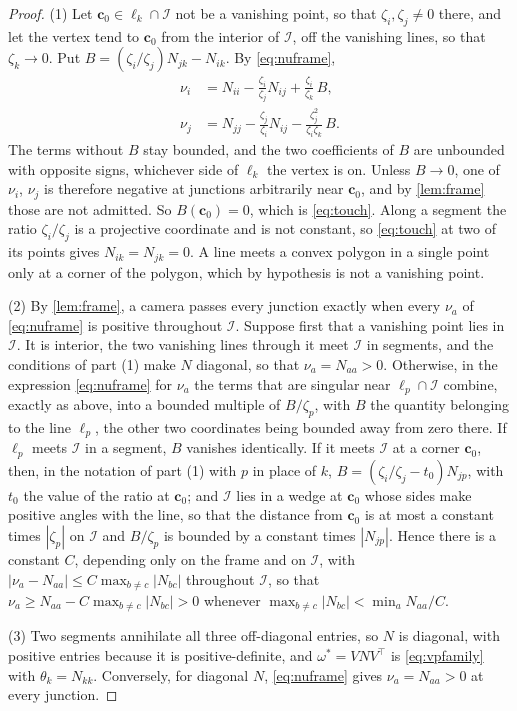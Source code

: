 \documentclass[pdflatex,sn-mathphys-num,iicol]{sn-jnl}
\newcommand{\vc}{\mathbf{c}}
\theoremstyle{thmstyleone}
\theoremstyle{thmstylethree}
\theoremstyle{thmstyletwo}
\begin{document}
\begin{proof}
(1) Let $\vc_0\in\ell_k\cap \mathcal I$ not be a vanishing point, so that $\zeta_i,\zeta_j\neq0$ there, and let the vertex tend to $\vc_0$ from the interior of $\mathcal I$, off the vanishing lines, so that $\zeta_k\to0$. Put $B=(\zeta_i/\zeta_j)N_{jk}-N_{ik}$. By \eqref{eq:nuframe},
\[
\begin{aligned}
\nu_i&=N_{ii}-\frac{\zeta_i}{\zeta_j}N_{ij}+\frac{\zeta_i}{\zeta_k}\,B,\\
\nu_j&=N_{jj}-\frac{\zeta_j}{\zeta_i}N_{ij}-\frac{\zeta_j^2}{\zeta_i\zeta_k}\,B .
\end{aligned}
\]
The terms without $B$ stay bounded, and the two coefficients of $B$ are unbounded with opposite signs, whichever side of $\ell_k$ the vertex is on. Unless $B\to0$, one of $\nu_i$, $\nu_j$ is therefore negative at junctions arbitrarily near $\vc_0$, and by \cref{lem:frame} those are not admitted. So $B(\vc_0)=0$, which is \eqref{eq:touch}. Along a segment the ratio $\zeta_i/\zeta_j$ is a projective coordinate and is not constant, so \eqref{eq:touch} at two of its points gives $N_{ik}=N_{jk}=0$. A line meets a convex polygon in a single point only at a corner of the polygon, which by hypothesis is not a vanishing point.

(2) By \cref{lem:frame}, a camera passes every junction exactly when every $\nu_a$ of \eqref{eq:nuframe} is positive throughout $\mathcal I$. Suppose first that a vanishing point lies in $\mathcal I$. It is interior, the two vanishing lines through it meet $\mathcal I$ in segments, and the conditions of part (1) make $N$ diagonal, so that $\nu_a=N_{aa}>0$. Otherwise, in the expression \eqref{eq:nuframe} for $\nu_a$ the terms that are singular near $\ell_p\cap \mathcal I$ combine, exactly as above, into a bounded multiple of $B/\zeta_p$, with $B$ the quantity belonging to the line $\ell_p$, the other two coordinates being bounded away from zero there. If $\ell_p$ meets $\mathcal I$ in a segment, $B$ vanishes identically. If it meets $\mathcal I$ at a corner $\vc_0$, then, in the notation of part (1) with $p$ in place of $k$, $B=(\zeta_i/\zeta_j-t_0)N_{jp}$, with $t_0$ the value of the ratio at $\vc_0$; and $\mathcal I$ lies in a wedge at $\vc_0$ whose sides make positive angles with the line, so that the distance from $\vc_0$ is at most a constant times $|\zeta_p|$ on $\mathcal I$ and $B/\zeta_p$ is bounded by a constant times $|N_{jp}|$. Hence there is a constant $C$, depending only on the frame and on $\mathcal I$, with $|\nu_a-N_{aa}|\le C\max_{b\neq c}|N_{bc}|$ throughout $\mathcal I$, so that $\nu_a\ge N_{aa}-C\max_{b\neq c}|N_{bc}|>0$ whenever $\max_{b\neq c}|N_{bc}|<\min_aN_{aa}/C$.

(3) Two segments annihilate all three off-diagonal entries, so $N$ is diagonal, with positive entries because it is positive-definite, and $\omega^{*}=VNV^{\top}$ is \eqref{eq:vpfamily} with $\theta_k=N_{kk}$. Conversely, for diagonal $N$, \eqref{eq:nuframe} gives $\nu_a=N_{aa}>0$ at every junction.
\end{proof}
\end{document}
